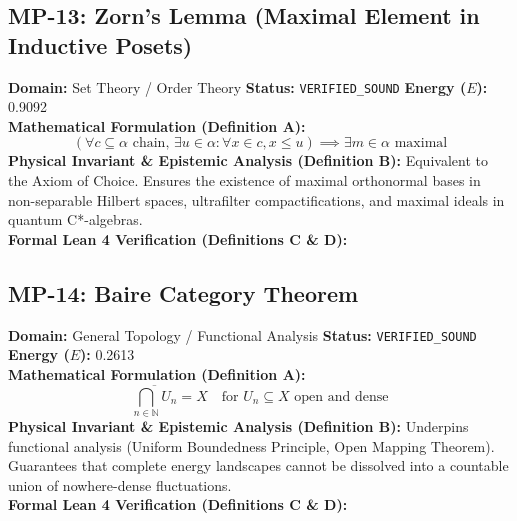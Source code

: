 \subsection{MP-13: Zorn's Lemma (Maximal Element in Inductive Posets)}
\textbf{Domain:} Set Theory / Order Theory \hfill \textbf{Status:} \texttt{VERIFIED\_SOUND} \hfill \textbf{Energy ($E$):} 0.9092\\
\textbf{Mathematical Formulation (Definition A):}
\begin{equation*}
\left(\forall c \subseteq \alpha \text{ chain}, \, \exists u \in \alpha: \forall x \in c, x \le u\right) \implies \exists m \in \alpha \text{ maximal}
\end{equation*}
\textbf{Physical Invariant \& Epistemic Analysis (Definition B):}
Equivalent to the Axiom of Choice. Ensures the existence of maximal orthonormal bases in non-separable Hilbert spaces, ultrafilter compactifications, and maximal ideals in quantum C*-algebras.\\

\textbf{Formal Lean 4 Verification (Definitions C \& D):}


\vspace{1em}
\subsection{MP-14: Baire Category Theorem}
\textbf{Domain:} General Topology / Functional Analysis \hfill \textbf{Status:} \texttt{VERIFIED\_SOUND} \hfill \textbf{Energy ($E$):} 0.2613\\
\textbf{Mathematical Formulation (Definition A):}
\begin{equation*}
\overline{\bigcap_{n \in \mathbb{N}} U_n} = X \quad \text{for } U_n \subseteq X \text{ open and dense}
\end{equation*}
\textbf{Physical Invariant \& Epistemic Analysis (Definition B):}
Underpins functional analysis (Uniform Boundedness Principle, Open Mapping Theorem). Guarantees that complete energy landscapes cannot be dissolved into a countable union of nowhere-dense fluctuations.\\

\textbf{Formal Lean 4 Verification (Definitions C \& D):}


\vspace{1em}

